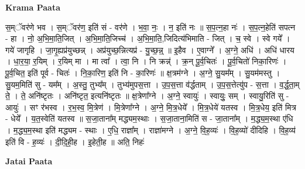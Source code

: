 \documentclass[17pt]{extarticle}
\begin{document}
\textbf{Krama Paata} \newline

स॒म्ॅवर॑णे भव । स॒म्ॅवर॑ण॒ इति॑ सं - वर॑णे । भ॒वा॒ नः॒ । न॒ इति॑ नः ॥ स॒प॒त्न॒हा नः॑ । स॒प॒त्न॒हेति॑ सपत्न - हा । नो॒ अ॒भि॒मा॒ति॒जित् । अ॒भि॒मा॒ति॒जिच्च॑ । अ॒भि॒मा॒ति॒,जिदित्य॑भिमाति - जित् । च॒ स्वे । स्वे गये᳚ । गये॑ जागृहि । जा॒गृ॒ह्यप्र॑युच्छन्न् । अप्र॑युच्छ॒न्नित्यप्र॑ - यु॒च्छ॒न्न्॒ ॥ इ॒हैव । ए॒वाग्ने᳚ । अ॒ग्ने॒ अधि॑ । अधि॑ धारय । धा॒र॒या॒ र॒यिम् । र॒यिम् मा । मा त्वा᳚ । त्वा॒ नि । नि क्रन्न्॑ । क्र॒न् पू॒र्व॒चितः॑ । पू॒र्व॒चितो॑ निका॒रिणः॑ । पू॒र्व॒चित॒ इति॑ पूर्व - चितः॑ । नि॒का॒रिण॒ इति॑ नि - का॒रिणः॑ ॥ क्ष॒त्रम॑ग्ने । अ॒ग्ने॒ सु॒यम᳚म् । सु॒यम॑मस्तु । सु॒यम॒मिति॑ सु - यम᳚म् । अ॒स्तु॒ तुभ्य᳚म् । तुभ्य॑मुपस॒त्ता । उ॒प॒स॒त्ता व॑र्द्धताम् । उ॒प॒स॒त्तेत्यु॑प - स॒त्ता । व॒र्द्ध॒ता॒म् ते॒ । ते॒ अनि॑ष्टृतः । अनि॑ष्टृत॒ इत्यनि॑ष्टृतः ॥ क्ष॒त्रेणा᳚ग्ने । अ॒ग्ने॒ स्वायुः॑ । स्वायुः॒ सम् । स्वायु॒रिति॑ सु - आयुः॑ । सꣳ र॑भस्व । र॒भ॒स्व॒ मि॒त्रेण॑ । मि॒त्रेणा᳚ग्ने । अ॒ग्ने॒ मि॒त्र॒धेये᳚ । मि॒त्र॒धेये॑ यतस्व । मि॒त्र॒धेय॒ इति॑ मित्र - धेये᳚ । य॒त॒स्वेति॑ यतस्व ॥ स॒जा॒ताना᳚म् मद्ध्यम॒स्थाः । स॒जा॒ताना॒मिति॑ स - जा॒ताना᳚म् । म॒द्ध्य॒म॒स्था ए॑धि । म॒द्ध्य॒म॒स्था इति॑ मद्ध्यम - स्थाः । ए॒धि॒ राज्ञा᳚म् । राज्ञा॑मग्ने । अ॒ग्ने॒ वि॒ह॒व्यः॑ । वि॒ह॒व्यो॑ दीदिहि । वि॒ह॒व्य॑ इति॑ वि - ह॒व्यः॑ । दी॒दि॒ही॒ह । इ॒हेती॒ह ॥ अति॒ निहः॑ \newline

\textbf{Jatai Paata} \newline
\end{document}

